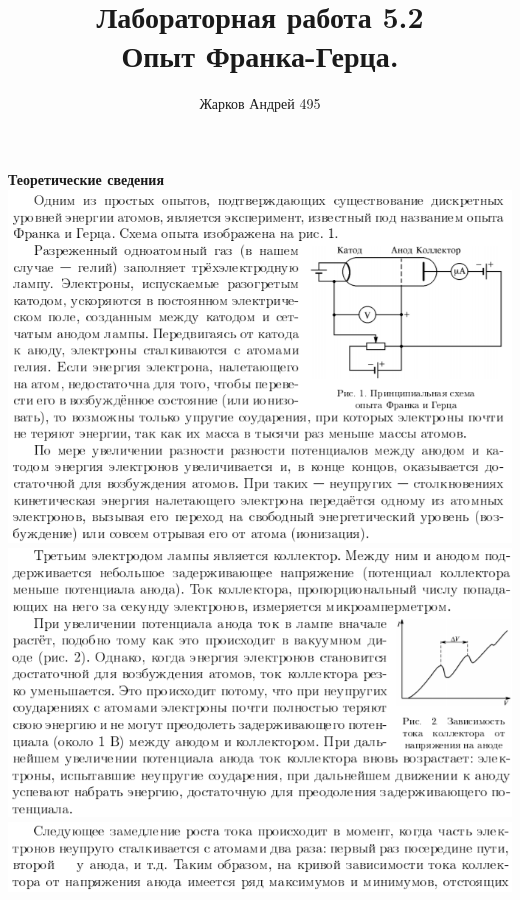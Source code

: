 \documentclass[12pt]{article}
\begin{document}
	\author {Жарков Андрей 495}
	\title {Лабораторная работа 5.2 \\  Опыт Франка-Герца.}
    \maketitle{}
    
    \begin{center}
    	\textbf{\large Теоретические сведения}\\
    	\includegraphics[width=14cm]{theory1.png}\\
    	\includegraphics[width=14cm]{theory2.png}\\
    	\includegraphics[width=16cm]{theory3.png}\\

\end{center}
\end{document}

